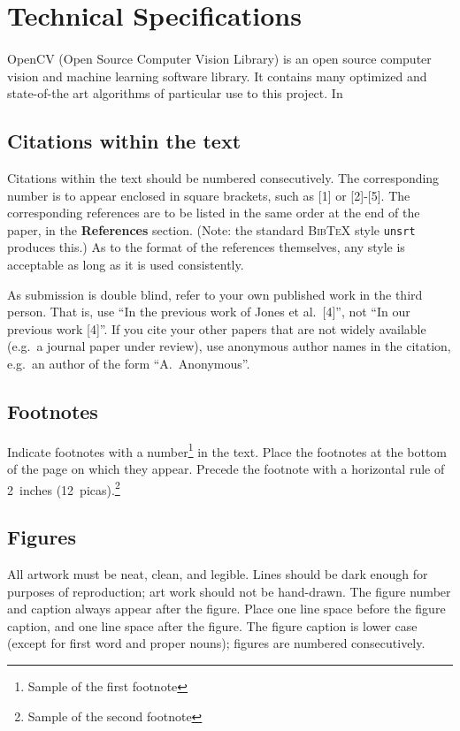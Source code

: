\documentclass{article} %
\begin{document}
\section{Technical Specifications}
\label{headings}

\paragraph{}OpenCV (Open Source Computer Vision Library) is an open source computer vision and machine learning software library. It contains many optimized and state-of-the art algorithms of particular use to this project. In

\subsection{Citations within the text}

Citations within the text should be numbered consecutively. The corresponding
number is to appear enclosed in square brackets, such as [1] or [2]-[5]. The
corresponding references are to be listed in the same order at the end of the
paper, in the \textbf{References} section. (Note: the standard
\textsc{Bib\TeX} style \texttt{unsrt} produces this.) As to the format of the
references themselves, any style is acceptable as long as it is used
consistently.

As submission is double blind, refer to your own published work in the 
third person. That is, use ``In the previous work of Jones et al.\ [4]'',
not ``In our previous work [4]''. If you cite your other papers that
are not widely available (e.g.\ a journal paper under review), use
anonymous author names in the citation, e.g.\ an author of the
form ``A.\ Anonymous''. 


\subsection{Footnotes}

Indicate footnotes with a number\footnote{Sample of the first footnote} in the
text. Place the footnotes at the bottom of the page on which they appear.
Precede the footnote with a horizontal rule of 2~inches
(12~picas).\footnote{Sample of the second footnote}

\subsection{Figures}

All artwork must be neat, clean, and legible. Lines should be dark
enough for purposes of reproduction; art work should not be
hand-drawn. The figure number and caption always appear after the
figure. Place one line space before the figure caption, and one line
space after the figure. The figure caption is lower case (except for
first word and proper nouns); figures are numbered consecutively.
\end{document}
